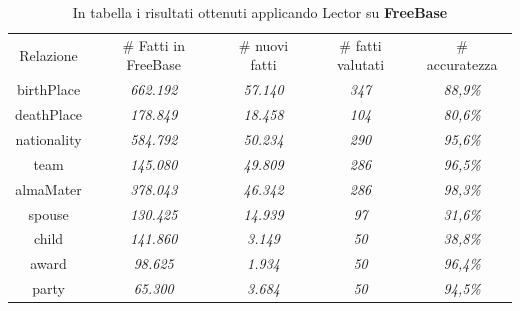 \documentclass[twocolumn,10pt]{asme2ej}
\begin{document}
\begin{table}[h]
\vspace*{-65pt}
\centering
\caption{In tabella i risultati ottenuti applicando Lector su \textbf{FreeBase}}
\begin{center}
\label{table_ASME}
\begin{tabular}{c c c c c}
& & \\ %
\hline
Relazione & \# Fatti in FreeBase & \# nuovi fatti & \# fatti valutati & \# accuratezza \\
\hline
birthPlace &  \textit{662.192} &   \textit{57.140}  &  \textit{347} &  \textit{88,9\%} \\
deathPlace &\textit{178.849} &   \textit{18.458} &  \textit{104} & \textit{80,6\%} \\
nationality & \textit{584.792} &   \textit{50.234} &  \textit{290} & \textit{95,6\%} \\
team & \textit{145.080} &   \textit{49.809}  &  \textit{286} & \textit{96,5\%} \\
almaMater & \textit{378.043} &   \textit{46.342}  &   \textit{286} & \textit{98,3\%} \\
spouse & \textit{130.425} &   \textit{14.939} &  \textit{97} & \textit{31,6\%} \\
child & \textit{141.860} &   \textit{3.149}  &  \textit{50} & \textit{38,8\%} \\
award & \textit{98.625} &   \textit{1.934}  &  \textit{50} & \textit{96,4\%} \\
party &\textit{65.300} &   \textit{3.684}  &  \textit{50}  & \textit{94,5\%} \\

\hline
\end{tabular}
\end{center}
\end{table}
\end{document}
